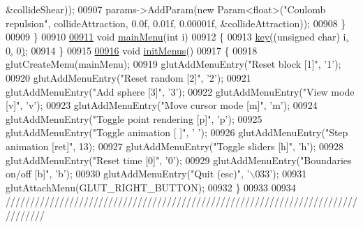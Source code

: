 \begin{DoxyCode}
{{{{{{{{       &collideShear));}
00907         params->AddParam(\textcolor{keyword}{new} Param<\textcolor{keywordtype}{float}>(\textcolor{stringliteral}{"Coulomb repulsion"}, collideAttraction, 0.0f, 0.01f, 
      0.00001f, &collideAttraction));
00908     \}
00909 \}
00910 
\hypertarget{particles_8cpp_source_l00911}{}\hyperlink{particles_8cpp_ac623a05dc7ab8844bdf40dc55c124fc6}{00911} \textcolor{keywordtype}{void} \hyperlink{particles_8cpp_ac623a05dc7ab8844bdf40dc55c124fc6}{mainMenu}(\textcolor{keywordtype}{int} i)
00912 \{
00913     \hyperlink{particles_8cpp_a09dcf1dc0fc67f47de1a59851fd7282e}{key}\hyperlink{particles_8cpp_a09dcf1dc0fc67f47de1a59851fd7282e}{(}(\textcolor{keywordtype}{unsigned} \textcolor{keywordtype}{char}) i\hyperlink{particles_8cpp_a09dcf1dc0fc67f47de1a59851fd7282e}{,} 0\hyperlink{particles_8cpp_a09dcf1dc0fc67f47de1a59851fd7282e}{,} 0\hyperlink{particles_8cpp_a09dcf1dc0fc67f47de1a59851fd7282e}{)};
00914 \}
00915 
\hypertarget{particles_8cpp_source_l00916}{}\hyperlink{particles_8cpp_a4f6bd2fa19ee682aad97e42cc236a861}{00916} \textcolor{keywordtype}{void} \hyperlink{particles_8cpp_a4f6bd2fa19ee682aad97e42cc236a861}{initMenus}()
00917 \{
00918     glutCreateMenu(mainMenu);
00919     glutAddMenuEntry(\textcolor{stringliteral}{"Reset block [1]"}, \textcolor{stringliteral}{'1'});
00920     glutAddMenuEntry(\textcolor{stringliteral}{"Reset random [2]"}, \textcolor{stringliteral}{'2'});
00921     glutAddMenuEntry(\textcolor{stringliteral}{"Add sphere [3]"}, \textcolor{stringliteral}{'3'});
00922     glutAddMenuEntry(\textcolor{stringliteral}{"View mode [v]"}, \textcolor{stringliteral}{'v'});
00923     glutAddMenuEntry(\textcolor{stringliteral}{"Move cursor mode [m]"}, \textcolor{stringliteral}{'m'});
00924     glutAddMenuEntry(\textcolor{stringliteral}{"Toggle point rendering [p]"}, \textcolor{stringliteral}{'p'});
00925     glutAddMenuEntry(\textcolor{stringliteral}{"Toggle animation [ ]"}, \textcolor{stringliteral}{' '});
00926     glutAddMenuEntry(\textcolor{stringliteral}{"Step animation [ret]"}, 13);
00927     glutAddMenuEntry(\textcolor{stringliteral}{"Toggle sliders [h]"}, \textcolor{stringliteral}{'h'});
00928         glutAddMenuEntry(\textcolor{stringliteral}{"Reset time [0]"}, \textcolor{stringliteral}{'0'});
00929         glutAddMenuEntry(\textcolor{stringliteral}{"Boundaries on/off [b]"}, \textcolor{stringliteral}{'b'});
00930     glutAddMenuEntry(\textcolor{stringliteral}{"Quit (esc)"}, \textcolor{stringliteral}{'\(\backslash\)033'});
00931     glutAttachMenu(GLUT\_RIGHT\_BUTTON);
00932 \}
00933 
00934 \textcolor{comment}{////////////////////////////////////////////////////////////////////////////////}
}}}}}}}
\end{DoxyCode}
